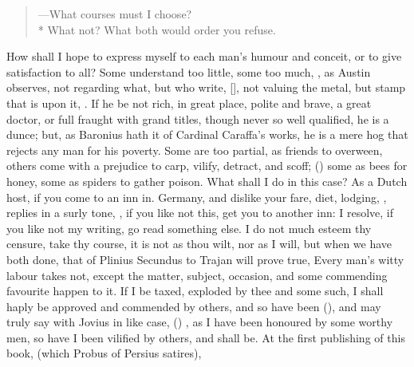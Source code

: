 {\begin{verse}
---What courses must I choose?\\*
What not? What both would order you refuse.
\end{verse}

How shall I hope to express myself to each man's humour and
conceit, or to give satisfaction to all? Some understand too
little, some too much, , as Austin observes, not regarding what, but who
write, [\baselineskip], not valuing the metal,
but stamp that is upon it, . If he
be not rich, in great place, polite and brave, a great doctor, or full
fraught with grand titles, though never so well qualified, he is a
dunce; but, as Baronius hath it of Cardinal Caraffa's works, he is
a mere hog that rejects any man for his poverty. Some are too partial,
as friends to overween, others come with a prejudice to carp, vilify,
detract, and scoff; () some as bees for honey, some as spiders to gather
poison. What shall I do in this case? As a Dutch host, if you come to
an inn in. Germany, and dislike your fare, diet, lodging, \etc, replies
in a surly tone, , if you like not
this, get you to another inn: I resolve, if you like not my writing, go
read something else. I do not much esteem thy censure, take thy course,
it is not as thou wilt, nor as I will, but when we have both done, that
of Plinius Secundus to Trajan will prove true, Every man's witty
labour takes not, except the matter, subject, occasion, and some
commending favourite happen to it. If I be taxed, exploded by thee and
some such, I shall haply be approved and commended by others, and so
have been (), and may truly say with Jovius in like
case, () , as I have been
honoured by some worthy men, so have I been vilified by others, and
shall be. At the first publishing of this book, (which Probus of
Persius satires), }
